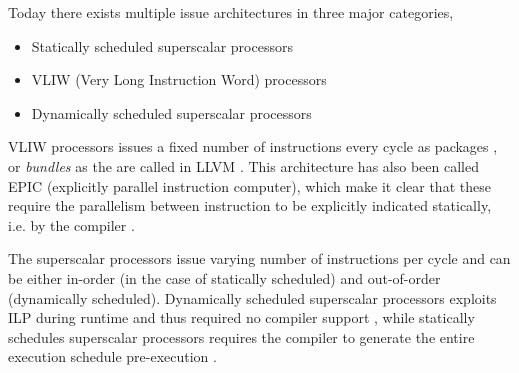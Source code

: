 Today there exists multiple issue architectures in three major categories\cite[Section~3.7]{caqa},

\begin{itemize}
	\item Statically scheduled superscalar processors
	\item VLIW (Very Long Instruction Word) processors
	\item Dynamically scheduled superscalar processors
\end{itemize}

VLIW processors issues a fixed number of instructions every cycle as packages \cite[Section~3.7]{caqa},
or \textit{bundles} as the are called in LLVM \cite{llvm-codegenerator-bundles}. This
architecture has also been called EPIC (explicitly parallel instruction computer), which
make it clear that these require the parallelism between instruction to be explicitly
indicated statically, i.e. by the compiler \cite[Section~3.7]{caqa}.

The superscalar processors issue varying number of instructions per cycle and can be either
in-order (in the case of statically scheduled) and out-of-order (dynamically scheduled).
Dynamically scheduled superscalar processors exploits ILP during runtime and thus required
no compiler support \cite[Section~3.4]{caqa}, while statically schedules superscalar
processors requires the compiler to generate the entire execution schedule pre-execution
\cite[Section~3.7]{caqa}.

